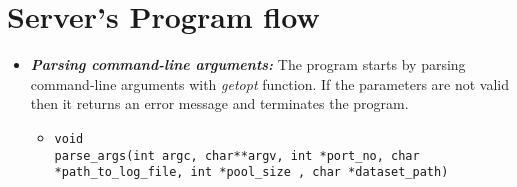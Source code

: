 \documentclass{article}
\begin{document}
\section{Server's Program flow}
\begin{itemize}

\item \textbf{\textit{Parsing command-line arguments:}} The program starts by parsing command-line arguments with \textit{getopt} function. If the parameters are not valid then it returns an error message and terminates the program.

\begin{itemize}
    \item
    \begin{lstlisting}
void
parse_args(int argc, char**argv, int *port_no, char *path_to_log_file, int *pool_size , char *dataset_path)
    \end{lstlisting}
\end{itemize}




\end{itemize}
\end{document}

